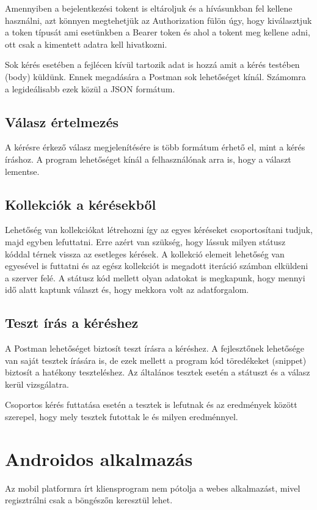 \documentclass[
]{thesis-ekf}
\theoremstyle{definition}
\theoremstyle{remark}
\begin{document}
	Amennyiben a bejelentkezési tokent is eltároljuk és a hívásunkban fel kellene használni, azt könnyen megtehetjük az Authorization fülön úgy, hogy kiválasztjuk a token típusát ami esetünkben a Bearer token és ahol a tokent meg kellene adni, ott csak a kimentett adatra kell hivatkozni. 
	
	Sok kérés esetében a fejlécen kívül tartozik adat is hozzá amit a kérés testében (body) küldünk. Ennek megadására a Postman sok lehetőséget kínál. Számomra a legideálisabb ezek közül a JSON formátum. 
	
	\section{Válasz értelmezés}
	A kérésre érkező válasz megjelenítésére is több formátum érhető el, mint a kérés íráshoz. A program lehetőséget kínál a felhasználónak arra is, hogy a választ lementse.
	
	\section{Kollekciók a kérésekből}
	Lehetőség van kollekciókat létrehozni így az egyes kéréseket csoportosítani tudjuk, majd egyben lefuttatni. Erre azért van szükség, hogy lássuk milyen státusz kóddal térnek vissza az esetleges kérések. A kollekció elemeit lehetőség van egyesével is futtatni és az egész kollekciót is megadott iteráció számban elküldeni a szerver felé. A státusz kód mellett olyan adatokat is megkapunk, hogy mennyi idő alatt kaptunk választ és, hogy mekkora volt az adatforgalom. 
	
	\section{Teszt írás a kéréshez}
	A Postman lehetőséget biztosít teszt írásra a kéréshez. A fejlesztőnek lehetősége van saját tesztek írására is, de ezek mellett a program kód töredékeket (snippet) biztosít a hatékony teszteléshez. Az általános tesztek esetén a státuszt és a válasz kerül vizsgálatra.
	
	Csoportos kérés futtatása esetén a tesztek is lefutnak és az eredmények között szerepel, hogy mely tesztek futottak le és milyen eredménnyel. 
	
	\chapter{Androidos alkalmazás}
	Az mobil platformra írt kliensprogram nem pótolja a webes alkalmazást, mivel regisztrálni csak a böngészőn keresztül lehet. 
\end{document}

